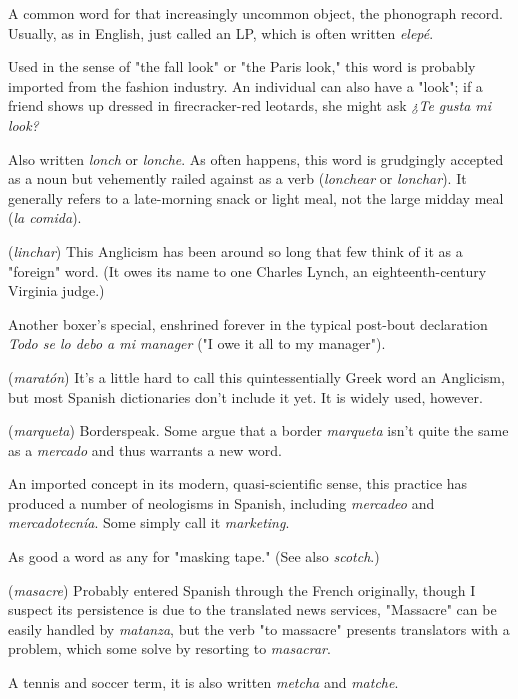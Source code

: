  A common word for that increasingly uncommon object, the phonograph record. Usually, as in English, just called
an LP, which is often written \emph{elepé}.

 Used in the sense of "the fall look" or "the Paris
look," this word is probably imported from the fashion industry. An
individual can also have a "look"; if a friend shows up dressed in
firecracker-red leotards, she might ask \emph{¿Te gusta mi look?}

 Also written \emph{lonch} or \emph{lonche}. As often happens, this
word is grudgingly accepted as a noun but vehemently railed against as
a verb (\emph{lonchear} or \emph{lonchar}). It generally refers to a late-morning snack
or light meal, not the large midday meal (\emph{la comida}).

 (\emph{linchar}) This Anglicism has been around so long that
few think of it as a "foreign" word. (It owes its name to one Charles
Lynch, an eighteenth-century Virginia judge.)

 Another boxer's special, enshrined forever in the
typical post-bout declaration \emph{Todo se lo debo a mi manager} ("I owe it
all to my manager").

 (\emph{maratón}) It's a little hard to call this quintessentially Greek word an Anglicism, but most Spanish dictionaries
don't include it yet. It is widely used, however.

 (\emph{marqueta}) Borderspeak. Some argue that a border
\emph{marqueta} isn't quite the same as a \emph{mercado} and thus warrants a
new word.

 An imported concept in its modern, quasi-scientific sense, this practice has produced a number of neologisms
in Spanish, including \emph{mercadeo} and \emph{mercadotecnía}. Some simply call
it \emph{marketing}.

 As good a word as any for "masking tape." (See
also \emph{scotch}.)

 (\emph{masacre}) Probably entered Spanish through the
French originally, though I suspect its persistence is due to the translated news services, "Massacre" can be easily handled by \emph{matanza}, but
the verb "to massacre" presents translators with a problem, which
some solve by resorting to \emph{masacrar}.

 A tennis and soccer term, it is also written \emph{metcha}
and \emph{matche}.


